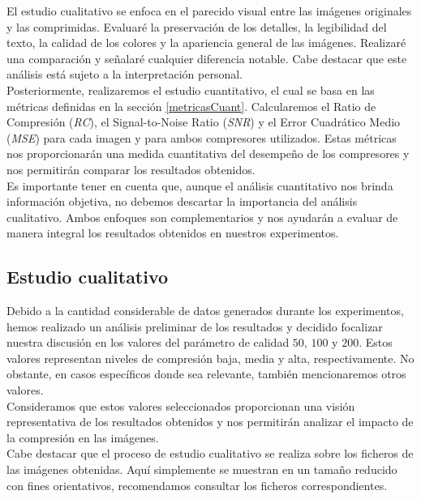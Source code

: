 \documentclass[12pt,a4paper]{article}
\begin{document}
El estudio cualitativo se enfoca en el parecido visual entre las imágenes originales y las comprimidas. Evaluaré la preservación de los detalles, la legibilidad del texto, la calidad de los colores y la apariencia general de las imágenes. Realizaré una comparación y señalaré cualquier diferencia notable. Cabe destacar que este análisis está sujeto a la interpretación personal.\\

Posteriormente, realizaremos el estudio cuantitativo, el cual se basa en las métricas definidas en la sección \ref{metricasCuant}. Calcularemos el Ratio de Compresión (\textit{RC}), el Signal-to-Noise Ratio (\textit{SNR}) y el Error Cuadrático Medio (\textit{MSE}) para cada imagen y para ambos compresores utilizados. Estas métricas nos proporcionarán una medida cuantitativa del desempeño de los compresores y nos permitirán comparar los resultados obtenidos.\\

Es importante tener en cuenta que, aunque el análisis cuantitativo nos brinda información objetiva, no debemos descartar la importancia del análisis cualitativo. Ambos enfoques son complementarios y nos ayudarán a evaluar de manera integral los resultados obtenidos en nuestros experimentos.\\

\subsection{Estudio cualitativo}
Debido a la cantidad considerable de datos generados durante los experimentos, hemos realizado un análisis preliminar de los resultados y decidido focalizar nuestra discusión en los valores del parámetro de calidad $50$, $100$ y $200$. Estos valores representan niveles de compresión baja, media y alta, respectivamente. No obstante, en casos específicos donde sea relevante, también mencionaremos otros valores.\\

Consideramos que estos valores seleccionados proporcionan una visión representativa de los resultados obtenidos y nos permitirán analizar el impacto de la compresión en las imágenes.\\

Cabe destacar que el proceso de estudio cualitativo se realiza sobre los ficheros de las imágenes obtenidas. Aquí simplemente se muestran en un tamaño reducido con fines orientativos, recomendamos consultar los ficheros correspondientes.\\
\end{document}
